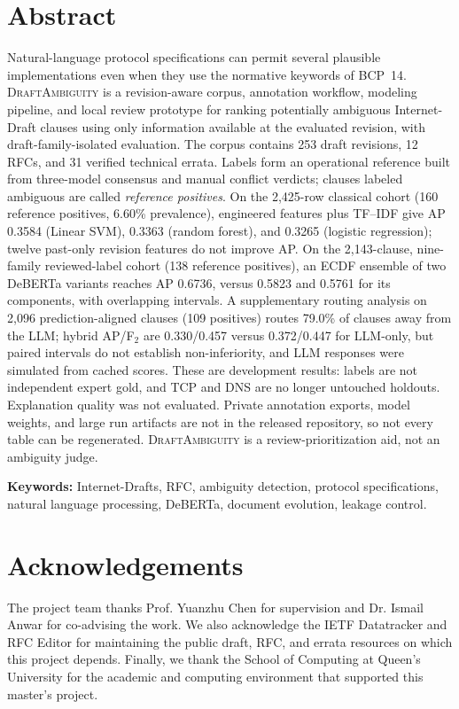 \documentclass[12pt,a4paper,oneside]{report}
\newcommand{\system}{\textsc{DraftAmbiguity}}
\begin{document}
\chapter*{Abstract}
Natural-language protocol specifications can permit several plausible implementations even when they use the normative keywords of BCP~14. \system{} is a revision-aware corpus, annotation workflow, modeling pipeline, and local review prototype for ranking potentially ambiguous Internet-Draft clauses using only information available at the evaluated revision, with draft-family-isolated evaluation. The corpus contains 253 draft revisions, 12 RFCs, and 31 verified technical errata. Labels form an operational reference built from three-model consensus and manual conflict verdicts; clauses labeled ambiguous are called \emph{reference positives}. On the 2,425-row classical cohort (160 reference positives, 6.60\% prevalence), engineered features plus TF--IDF give AP 0.3584 (Linear SVM), 0.3363 (random forest), and 0.3265 (logistic regression); twelve past-only revision features do not improve AP. On the 2,143-clause, nine-family reviewed-label cohort (138 reference positives), an ECDF ensemble of two DeBERTa variants reaches AP 0.6736, versus 0.5823 and 0.5761 for its components, with overlapping intervals. A supplementary routing analysis on 2,096 prediction-aligned clauses (109 positives) routes 79.0\% of clauses away from the LLM; hybrid AP/F$_2$ are 0.330/0.457 versus 0.372/0.447 for LLM-only, but paired intervals do not establish non-inferiority, and LLM responses were simulated from cached scores. These are development results: labels are not independent expert gold, and TCP and DNS are no longer untouched holdouts. Explanation quality was not evaluated. Private annotation exports, model weights, and large run artifacts are not in the released repository, so not every table can be regenerated. \system{} is a review-prioritization aid, not an ambiguity judge.

\noindent\textbf{Keywords:} Internet-Drafts, RFC, ambiguity detection, protocol specifications, natural language processing, DeBERTa, document evolution, leakage control.

\chapter*{Acknowledgements}
The project team thanks Prof. Yuanzhu Chen for supervision and Dr. Ismail Anwar for co-advising the work. We also acknowledge the IETF Datatracker and RFC Editor for maintaining the public draft, RFC, and errata resources on which this project depends. Finally, we thank the School of Computing at Queen's University for the academic and computing environment that supported this master's project.
\end{document}
